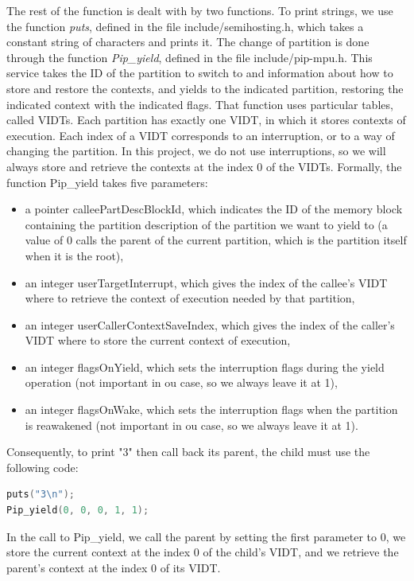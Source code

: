 \documentclass[10pt,a4paper,titlepage]{refart}
\begin{document}
The rest of the function is dealt with by two functions. To print strings, we use the function \textit{puts}, defined in the file 
include/semihosting{.}h, which takes a constant string of characters and prints it. The change of partition is done through the function 
\textit{Pip\_yield}, defined in the file include/pip-mpu{.}h. This service takes the ID of the partition to switch to and information
about how to store and restore the contexts, and yields to the indicated partition, restoring the indicated context with the indicated flags.
That function uses particular tables, called VIDTs. Each partition has exactly one VIDT, in which it stores contexts of execution.
Each index of a VIDT corresponds to an interruption, or to a way of changing the partition. In this project, we do not use interruptions,
so we will always store and retrieve the contexts at the index 0 of the VIDTs. Formally, the function Pip\_yield takes five parameters:
\begin{itemize}
    \item a pointer calleePartDescBlockId, which indicates the ID of the memory block containing the partition description of the 
    partition we want to yield to (a value of 0 calls the parent of the current partition, which is the partition itself when it is the 
    root),
    \item an integer userTargetInterrupt, which gives the index of the callee's VIDT where to retrieve the context of execution needed by 
    that partition,
    \item an integer userCallerContextSaveIndex, which gives the index of the caller's VIDT where to store the current context of 
    execution,
    \item an integer flagsOnYield, which sets the interruption flags during the yield operation (not important in ou case, so we always 
    leave it at 1),
    \item an integer flagsOnWake, which sets the interruption flags when the partition is reawakened (not important in ou case, so we always 
    leave it at 1).
\end{itemize}
Consequently, to print "3" then call back its parent, the child must use the following code:
\begin{lstlisting}[language=C]
puts("3\n");
Pip_yield(0, 0, 0, 1, 1);
\end{lstlisting}
In the call to Pip\_yield, we call the parent by setting the first parameter to 0, we store the current context at the index 0 of the 
child's VIDT, and we retrieve the parent's context at the index 0 of its VIDT.
\end{document}
